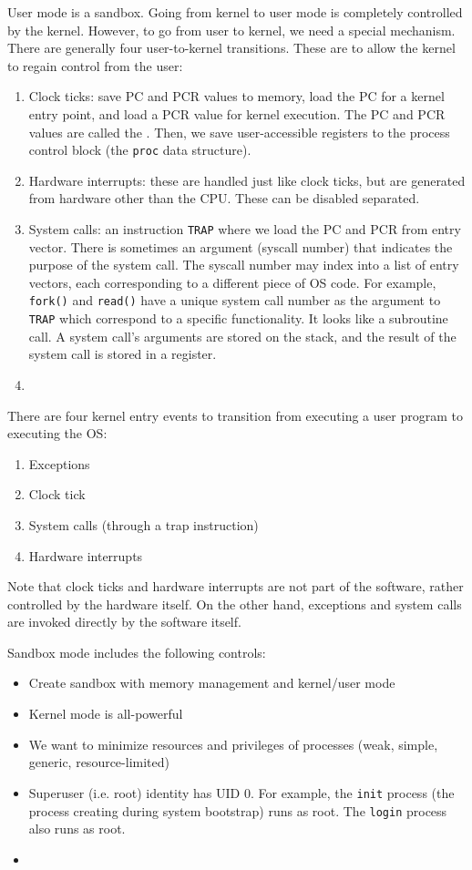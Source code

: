 \documentclass[code]{amznotes}
\begin{document}
User mode is a sandbox. Going from kernel to user mode is completely controlled by the kernel. However, to go from user to kernel, we need a special mechanism. There are generally four user-to-kernel transitions. These are to allow the kernel to regain control from the user:
\begin{enumerate}
    \item Clock ticks: save PC and PCR values to memory, load the PC for a kernel entry point, and load a PCR value for kernel execution. The PC and PCR values are called the . Then, we save user-accessible registers to the process control block (the \texttt{proc} data structure).
    \item Hardware interrupts: these are handled just like clock ticks, but are generated from hardware other than the CPU. These can be disabled separated.
    \item System calls: an instruction \texttt{TRAP} where we load the PC and PCR from entry vector. There is sometimes an argument (syscall number) that indicates the purpose of the system call. The syscall number may index into a list of entry vectors, each corresponding to a different piece of OS code. For example, \texttt{fork()} and \texttt{read()} have a unique system call number as the argument to \texttt{TRAP} which correspond to a specific functionality. It looks like a subroutine call. A system call's arguments are stored on the stack, and the result of the system call is stored in a register.
    \item 
\end{enumerate}

There are four kernel entry events to transition from executing a user program to executing the OS:
\begin{enumerate}
    \item Exceptions
    \item Clock tick
    \item System calls (through a trap instruction)
    \item Hardware interrupts
\end{enumerate}

Note that clock ticks and hardware interrupts are not part of the software, rather controlled by the hardware itself. On the other hand, exceptions and system calls are invoked directly by the software itself.

Sandbox mode includes the following controls:
\begin{itemize}
    \item Create sandbox with memory management and kernel/user mode
    \item Kernel mode is all-powerful
    \item We want to minimize resources and privileges of processes (weak, simple, generic, resource-limited)
    \item Superuser (i.e. root) identity has UID 0. For example, the \texttt{init} process (the process creating during system bootstrap) runs as root. The \texttt{login} process also runs as root.
    \item 
\end{itemize}
\end{document}
